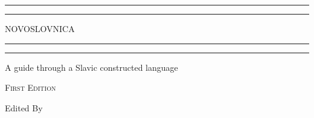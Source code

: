 \newcommand{\plogo}{\fbox{$\mathcal{KRIN}$}} %

\begin{titlepage} %
	
	\centering %
	
	\scshape %
	
	\vspace*{\baselineskip} %
	
	
	\rule{\textwidth}{1.6pt}\vspace*{-\baselineskip}\vspace*{2pt} %
	\rule{\textwidth}{0.4pt} %
	
	\vspace{0.75\baselineskip} %
	
	{\LARGE NOVOSLOVNICA} %
	
	\vspace{0.75\baselineskip} %
	
	\rule{\textwidth}{0.4pt}\vspace*{-\baselineskip}\vspace{3.2pt} %
	\rule{\textwidth}{1.6pt} %
	
	\vspace{2\baselineskip} %
	
	
	A guide through a Slavic constructed language %
	
	\vspace{0.75\baselineskip} %
	
	{\scshape\small First Edition \\}
	
	\vspace*{3\baselineskip} %
	
	
	Edited By
	

\end{titlepage}
